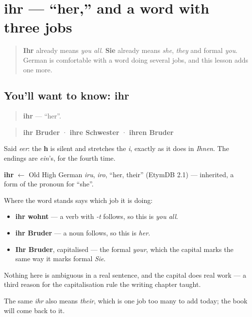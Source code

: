 \section[ihr]{ihr — \textquotedblleft{}her,\textquotedblright{} and a word with three jobs}

\label{lesson:GE-C36-ihr-her}



\begin{quote}
\textbf{Ihr} already means \emph{you all}. \textbf{Sie} already means \emph{she}, \emph{they} and formal \emph{you}. German is comfortable with a word doing several jobs, and this lesson adds one more.
\end{quote}

\subsection*{You'll want to know: ihr}
\begin{quote}
\textbf{ihr} — \textquotedblleft{}her\textquotedblright{}.
\end{quote}

\begin{quote}
\textbf{ihr Bruder} · \textbf{ihre Schwester} · \textbf{ihren Bruder}
\end{quote}

Said \emph{eer}: the \textbf{h} is silent and stretches the \emph{i}, exactly as it does in \emph{Ihnen}. The endings are \emph{ein}'s, for the fourth time.

\begin{cousinweb}
\textbf{ihr} $\leftarrow$ Old High German \emph{iru}, \emph{iro}, \textquotedblleft{}her, their\textquotedblright{} (EtymDB 2.1) — inherited, a form of the pronoun for \textquotedblleft{}she\textquotedblright{}.
\end{cousinweb}

\begin{grammarlens}[title={Grammar Lens: three jobs, all settled by position}]
Where the word stands says which job it is doing:

\begin{itemize}
\raggedright
  \item \textbf{ihr wohnt} — a verb with \emph{-t} follows, so this is \emph{you all}.
  \item \textbf{ihr Bruder} — a noun follows, so this is \emph{her}.
  \item \textbf{Ihr Bruder}, capitalised — the formal \emph{your}, which the capital marks the same way it marks formal \emph{Sie}.
\end{itemize}

Nothing here is ambiguous in a real sentence, and the capital does real work — a third reason for the capitalisation rule the writing chapter taught.

The same \emph{ihr} also means \emph{their}, which is one job too many to add today; the book will come back to it.
\end{grammarlens}

